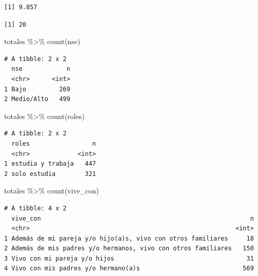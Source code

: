 \documentclass[
  letterpaper,
  DIV=11,
  numbers=noendperiod]{scrartcl}
\newenvironment{Shaded}{\begin{snugshade}}{\end{snugshade}}
\newcommand{\AttributeTok}[1]{\textcolor[rgb]{0.40,0.45,0.13}{#1}}
\newcommand{\FunctionTok}[1]{\textcolor[rgb]{0.28,0.35,0.67}{#1}}
\newcommand{\NormalTok}[1]{\textcolor[rgb]{0.00,0.23,0.31}{#1}}
\newcommand{\SpecialCharTok}[1]{\textcolor[rgb]{0.37,0.37,0.37}{#1}}
\begin{document}
\begin{verbatim}
[1] 9.857
\end{verbatim}

\begin{Shaded}
\end{Shaded}

\begin{verbatim}
[1] 20
\end{verbatim}

\begin{Shaded}
\begin{Highlighting}[]
\NormalTok{totales }\SpecialCharTok{\%\textgreater{}\%} \FunctionTok{count}\NormalTok{(nse)}
\end{Highlighting}
\end{Shaded}

\begin{verbatim}
# A tibble: 2 x 2
  nse            n
  <chr>      <int>
1 Bajo         269
2 Medio/Alto   499
\end{verbatim}

\begin{Shaded}
\begin{Highlighting}[]
\NormalTok{totales }\SpecialCharTok{\%\textgreater{}\%} \FunctionTok{count}\NormalTok{(roles)}
\end{Highlighting}
\end{Shaded}

\begin{verbatim}
# A tibble: 2 x 2
  roles                 n
  <chr>             <int>
1 estudia y trabaja   447
2 solo estudia        321
\end{verbatim}

\begin{Shaded}
\begin{Highlighting}[]
\NormalTok{totales }\SpecialCharTok{\%\textgreater{}\%} \FunctionTok{count}\NormalTok{(vive\_con)}
\end{Highlighting}
\end{Shaded}

\begin{verbatim}
# A tibble: 4 x 2
  vive_con                                                         n
  <chr>                                                        <int>
1 Además de mi pareja y/o hijo(a)s, vivo con otros familiares     18
2 Además de mis padres y/o hermanos, vivo con otros familiares   150
3 Vivo con mi pareja y/o hijos                                    31
4 Vivo con mis padres y/o hermano(a)s                            569
\end{verbatim}
\end{document}
